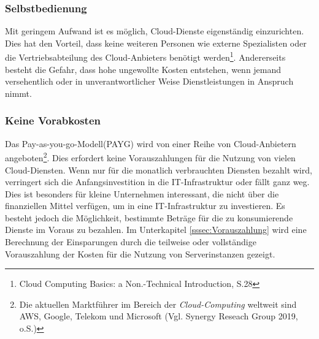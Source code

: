 \subsubsection{Selbstbedienung}
Mit geringem Aufwand ist es möglich, Cloud-Dienste eigenständig einzurichten. Dies hat den Vorteil, dass keine weiteren Personen wie externe Spezialisten oder die Vertriebsabteilung des Cloud-Anbieters  benötigt werden\footnote{Cloud Computing Basics: a Non.-Technical Introduction, S.28\cite{CCB}}.
Andererseits besteht die Gefahr, dass hohe ungewollte Kosten entstehen, wenn jemand versehentlich oder in unverantwortlicher Weise Dienstleistungen in Anspruch nimmt.    

\subsubsection{Keine Vorabkosten}
Das Pay-as-you-go-Modell(PAYG) wird von einer Reihe von Cloud-Anbietern angeboten\footnote{ Die aktuellen Marktführer im Bereich der \textit{Cloud-Computing} weltweit sind AWS, Google, Telekom und Microsoft (Vgl. Synergy Reseach Group 2019, o.S.\cite{STA6})}. Dies erfordert keine Vorauszahlungen für die Nutzung von vielen Cloud-Diensten. Wenn nur für die monatlich verbrauchten Diensten bezahlt wird, verringert sich die Anfangsinvestition in die IT-Infrastruktur oder fällt ganz weg. Dies ist besonders für kleine Unternehmen interessant, die nicht über die finanziellen Mittel verfügen, um in eine IT-Infrastruktur zu investieren. Es besteht jedoch die Möglichkeit, bestimmte Beträge für die zu konsumierende Dienste im Voraus zu bezahlen. Im Unterkapitel \ref{sssec:Vorauszahlung} wird eine Berechnung der Einsparungen durch die teilweise oder vollständige Vorauszahlung der Kosten für die Nutzung von Serverinstanzen gezeigt.  





